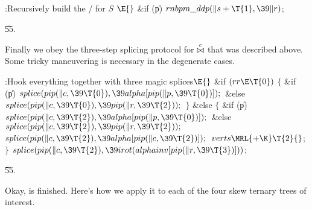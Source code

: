 \B{}:Recursively build the \RNBPM/ for $S$%
\X${}\E{}$\6
\&{if} (\|p)\1\5
${}\\{rnbpm\_ddp}(\|s+\T{1},\39\|r){}$;\2\par
\U55.\fi

Finally we obey the three-step splicing
protocol for $\join c$ that was
described above. Some tricky maneuvering is necessary in the degenerate
cases.

\Y\B\4:Hook everything together with three magic splices\X${}\E{}$\6
\&{if} ${}(\\{rr}\E\T{0}){}$\5
${}\{{}$\1\6
\&{if} (\|p)\1\5
${}\\{splice}(\\{pip}(\|c,\39\T{0}),\39\\{alpha}[\\{pip}(\|p,\39\T{0})]);{}$\2\6
\&{else}\1\5
${}\\{splice}(\\{pip}(\|c,\39\T{0}),\39\\{pip}(\|r,\39\T{2}));{}$\2\6
\4${}\}{}$\5
\2\&{else}\5
${}\{{}$\1\6
\&{if} (\|p)\1\5
${}\\{splice}(\\{pip}(\|c,\39\T{2}),\39\\{alpha}[\\{pip}(\|p,\39\T{0})]);{}$\2\6
\&{else}\1\5
${}\\{splice}(\\{pip}(\|c,\39\T{2}),\39\\{pip}(\|r,\39\T{2}));{}$\2\6
${}\\{splice}(\\{pip}(\|c,\39\T{2}),\39\\{alpha}[\\{pip}(\|c,\39\T{2})]);{}$\6
${}\\{verts}\MRL{+{\K}}\T{2}{}$;\6
\4${}\}{}$\2\6
${}\\{splice}(\\{pip}(\|c,\39\T{2}),\39\\{irot}(\\{alphainv}[\\{pip}(\|r,\39%
\T{3})])){}$;\par
\U55.\fi

Okay,  is finished.
Here's how we apply it to each of the four skew ternary
trees of interest.

